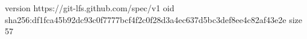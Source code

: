 version https://git-lfs.github.com/spec/v1
oid sha256:df1fca45b92dc93c0f7777bcf4f2c0f28d3a4ec637d5bc3def8ee4c82af43e2e
size 57
